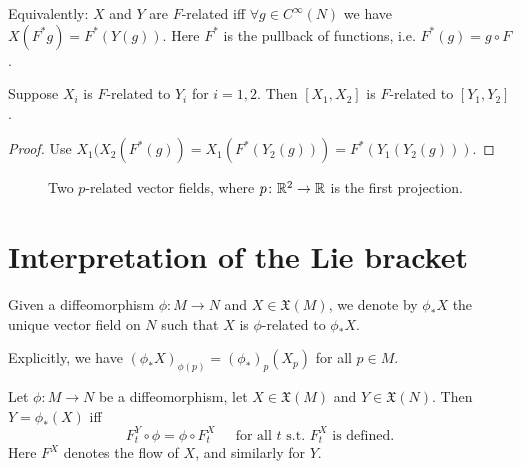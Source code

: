 \begin{remark}
Equivalently: $X$ and $Y$ are $F$-related iff  $\forall  g \in C^{\infty}(N)$ we have $X(F^{*}g) = F^{*}(Y(g))$. Here $F^{*}$ is the pullback of functions, i.e. $F^*(g)=g\circ F$.
\end{remark}
\begin{prop}
Suppose $X_i$ is $F$-related to $Y_i$ for $i = 1, 2$.
    Then  $[X_1, X_2]$ is $F$-related to $[Y_1, Y_2]$.
\end{prop}
\begin{proof}
Use $X_1(X_2(F^* (g))=  X_1(F^* (Y_2(g)))=F^* (Y_1(Y_2(g)))$.
\end{proof}
\begin{figure}[H]
    \centering
    \caption{Two $p$-related vector fields, where $p\colon \mathbb{R}^2\to \mathbb{R}$ is the first projection.}
    \label{fig:f-related}
\end{figure}





\section{Interpretation of the Lie bracket}

 

\begin{definition} 
    Given a diffeomorphism $\phi: M \to  N$ and $X \in \mathfrak{X}(M)$,
 we denote by $\phi_*X$  the unique vector field on $N$ such that $X$ is $\phi$-related to $\phi_*X$.
\end{definition}
Explicitly, we have $(\phi_*X)_{\phi(p)}=(\phi_*)_p(X_p)$ for all $p\in M$.
\begin{lemma}
    Let $\phi: M \to  N$ be a diffeomorphism,
let    $X \in \mathfrak{X}(M)$ and $Y \in \mathfrak{X}(N)$.
    Then $Y = \phi_*(X)$ iff  $$F^{Y}_t  \circ \phi= \phi  \circ  F^{X}_t \;\;\;\; \text{ for all $t$ s.t. $F^{X}_t$ is defined}.$$
 Here $F^{X}$ denotes the flow of $X$, and similarly for $Y$.
\end{lemma}

